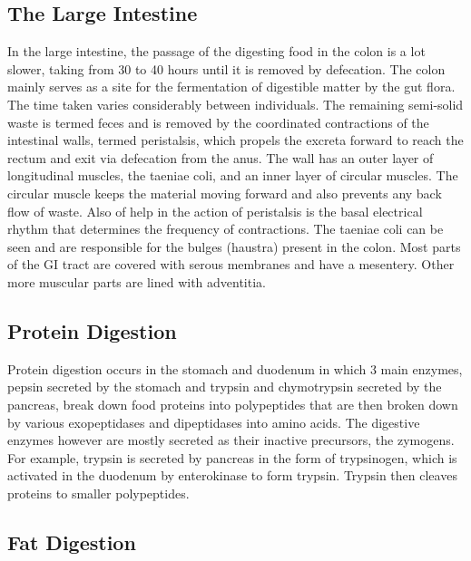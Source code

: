 \hypertarget{the-large-intestine}{%
\subsection{The Large Intestine}\label{the-large-intestine}}

In the large intestine, the passage of the digesting food in the colon is a lot slower, taking from 30 to 40 hours until it is removed by defecation. The colon mainly serves as a site for the fermentation of digestible matter by the gut flora. The time taken varies considerably between individuals. The remaining semi-solid waste is termed feces and is removed by the coordinated contractions of the intestinal walls, termed peristalsis, which propels the excreta forward to reach the rectum and exit via defecation from the anus. The wall has an outer layer of longitudinal muscles, the taeniae coli, and an inner layer of circular muscles. The circular muscle keeps the material moving forward and also prevents any back flow of waste. Also of help in the action of peristalsis is the basal electrical rhythm that determines the frequency of contractions. The taeniae coli can be seen and are responsible for the bulges (haustra) present in the colon. Most parts of the GI tract are covered with serous membranes and have a mesentery. Other more muscular parts are lined with adventitia.

\hypertarget{protein-digestion}{%
\subsection{Protein Digestion}\label{protein-digestion}}

Protein digestion occurs in the stomach and duodenum in which 3 main enzymes, pepsin secreted by the stomach and trypsin and chymotrypsin secreted by the pancreas, break down food proteins into polypeptides that are then broken down by various exopeptidases and dipeptidases into amino acids. The digestive enzymes however are mostly secreted as their inactive precursors, the zymogens. For example, trypsin is secreted by pancreas in the form of trypsinogen, which is activated in the duodenum by enterokinase to form trypsin. Trypsin then cleaves proteins to smaller polypeptides.

\hypertarget{fat-digestion}{%
\subsection{Fat Digestion}\label{fat-digestion}}


